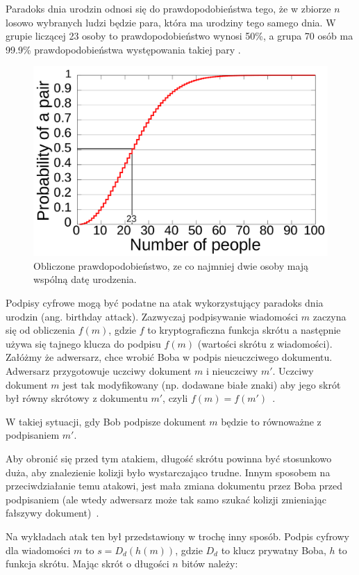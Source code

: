 \documentclass[wi]{zut}
\begin{document}
Paradoks dnia urodzin odnosi się do prawdopodobieństwa tego, że w zbiorze $n$ losowo wybranych ludzi będzie para, która ma urodziny tego samego dnia. W grupie liczącej 23 osoby to prawdopodobieństwo wynosi 50\%, a grupa 70 osób ma 99.9\% prawdopodobieństwa występowania takiej pary \cite{wiki:Birthday_problem}.


\begin{figure}[H]
    \centering
    \includegraphics[width=0.5\linewidth]{images/Birthday_Paradox.svg.png}
    \caption{Obliczone prawdopodobieństwo, ze co najmniej dwie osoby mają wspólną datę urodzenia.}
    \label{fig:birthdaj}
\end{figure}

Podpisy cyfrowe mogą być podatne na atak wykorzystujący paradoks dnia urodzin (ang. birthday attack). Zazwyczaj podpisywanie wiadomości $m$ zaczyna się od obliczenia $f(m)$, gdzie $f$ to kryptograficzna funkcja skrótu a następnie używa się tajnego klucza do podpisu $f(m)$ (wartości skrótu z wiadomości). Załóżmy że adwersarz, chce wrobić Boba w podpis nieuczciwego dokumentu. Adwersarz przygotowuje uczciwy dokument $m$ i nieuczciwy $m'$. Uczciwy dokument $m$ jest tak modyfikowany (np. dodawane białe znaki) aby jego skrót był równy skrótowy z dokumentu $m'$, czyli $f(m) = f(m')$~\cite{wiki:Birthday_problem}.

W takiej sytuacji, gdy Bob podpisze dokument $m$ będzie to równoważne z podpisaniem $m'$.

Aby obronić się przed tym atakiem, długość skrótu powinna być stosunkowo duża, aby znalezienie kolizji było wystarczająco trudne. Innym sposobem na przeciwdziałanie temu atakowi, jest mała zmiana dokumentu przez Boba przed podpisaniem (ale wtedy adwersarz może tak samo szukać kolizji zmieniając fałszywy dokument)~\cite{wiki:Birthday_problem}.

Na wykładach atak ten był przedstawiony w trochę inny sposób. Podpis cyfrowy dla wiadomości $m$ to $s = D_d(h(m))$, gdzie $D_d$ to klucz prywatny Boba, $h$ to funkcja skrótu. Mając skrót o długości $n$ bitów należy:
\end{document}
